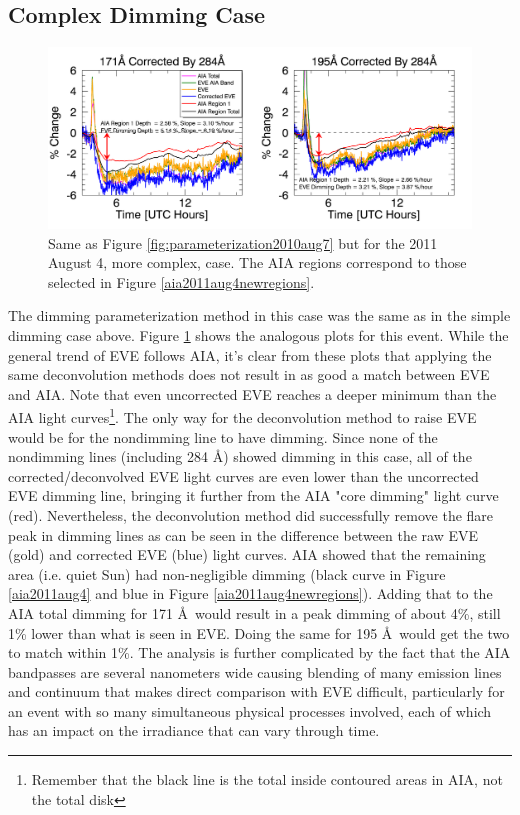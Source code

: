 \subsection{Complex Dimming Case}

\begin{figure}[!h]
    \begin{center}
	    \includegraphics[width=166mm]{Images/EveCorrectionResults2011Aug4.png}
    \end{center}
    \caption[Dimming parameterization for 2011 August 4 event]{
        Same as Figure \ref{fig:parameterization2010aug7} but for the 2011 August 4, more complex, case. The AIA regions
        correspond to those selected in Figure \ref{aia2011aug4newregions}. 
   	}
    \label{fig:parameterization2011aug4}
\end{figure}

The dimming parameterization method in this case was the same as in the simple dimming case above. Figure \ref{fig:parameterization2011aug4} shows the analogous plots for this event. While the general trend of EVE follows AIA, it's clear from these plots that applying the same deconvolution methods does not result in as good a match between EVE and AIA. Note that even uncorrected EVE reaches a deeper minimum than the AIA light curves\footnote{Remember that the black line is the total inside contoured areas in AIA, not the total disk}. The only way for the deconvolution method to raise EVE would be for the nondimming line to have dimming. Since none of the nondimming lines (including 284 \AA) showed dimming in this case, all of the corrected/deconvolved EVE light curves are even lower than the uncorrected EVE dimming line, bringing it further from the AIA "core dimming" light curve (red). Nevertheless, the deconvolution method did successfully remove the flare peak in dimming lines as can be seen in the difference between the raw EVE (gold) and corrected EVE (blue) light curves. AIA showed that the remaining area (i.e. quiet Sun) had non-negligible dimming (black curve in Figure \ref{aia2011aug4} and blue in Figure \ref{aia2011aug4newregions}). Adding that to the AIA total dimming for 171 \AA\ would result in a peak dimming of about 4\%, still 1\% lower than what is seen in EVE. Doing the same for 195 \AA\ would get the two to match within 1\%. The analysis is further complicated by the fact that the AIA bandpasses are several nanometers wide causing blending of many emission lines and continuum that makes direct comparison with EVE difficult, particularly for an event with so many simultaneous physical processes involved, each of which has an impact on the irradiance that can vary through time. 

